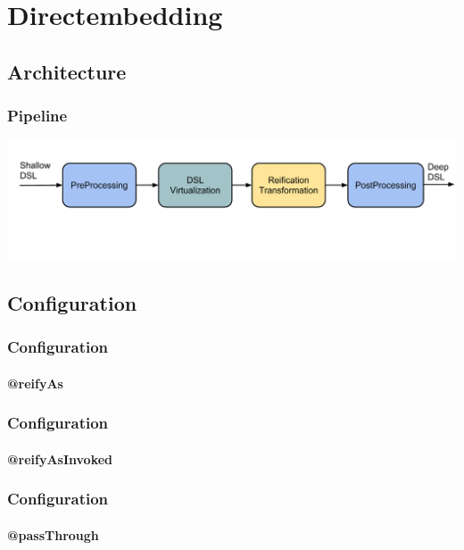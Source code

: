 \documentclass[xcolor=dvipsnames]{beamer}
\theoremstyle{definition}
\begin{document}
\section{Directembedding} %
\label{sec:Directembedding}

\subsection{Architecture} %
\label{sub:Architecture}

\begin{frame}[fragile]
    \frametitle{Pipeline}
    \begin{center}
        \includegraphics[width=\textwidth]{img/Architecture.pdf}
    \end{center}
\end{frame}

\subsection{Configuration} %
\label{sub:Directembeddingconfiguration}
\begin{frame}[fragile]
    \frametitle{Configuration}
    \framesubtitle{@reifyAs}
    \begin{block}{}
        
    \end{block}
\end{frame}

\begin{frame}[fragile]
    \frametitle{Configuration}
    \framesubtitle{@reifyAsInvoked}
    \begin{block}{}
        
    \end{block}
\end{frame}

\begin{frame}[fragile]
    \frametitle{Configuration}
    \framesubtitle{@passThrough}
    \begin{block}{}
        
    \end{block}
\end{frame}
\end{document}
